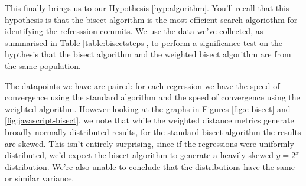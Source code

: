 \documentclass[10pt,journal,compsoc]{IEEEtran}
\begin{document}
\begin{figure*}[t]
\centering
{}
\hfil
{}
\hfil
{}
\hfil
{}
\caption{\label{fig:c-bisect}Histograms for the C language of the number of steps required to complete the bisect algorithm using (a) the standard metrix; (b) the weighted commit metric; (c) the weighted lines changed metric; (d) the weighted hunks changed metric. The dashed line indicates the mean, the dotted lines a one-standard-deviation interval on each side it.}
\end{figure*}

\begin{figure*}[t]
\centering
{}
\hfil
{}
\hfil
{}
\hfil
{}
\caption{\label{fig:javascript-bisect}Histograms for the JavaScript language of the number of steps required to complete the bisect algorithm using (a) the standard metrix; (b) the weighted commit metric; (c) the weighted lines changed metric; (d) the weighted hunks changed metric. The dashed line indicates the mean, the dotted lines a one-standard-deviation interval on each side it.}
\end{figure*}

This finally brings us to our Hypothesis \ref{hyp:algorithm}. You'll recall that this hypothesis is that the bisect algorithm is the most efficient search algoriothm for identifying the refresssion commits. We use the data we've collected, as summarised in Table \ref{table:bisectsteps}, to perform a significance test on the hypthesis that the bisect algorithm and the weighted bisect algorithm are from the same population.

The datapoints we have are paired: for each regression we have the speed of convergence using the standard algorithm and the speed of convergence using the weighted algorithm. However looking at the graphs in Figures \ref{fig:c-bisect} and \ref{fig:javascript-bisect}, we note that while the weighted distance metrics generate broadly normally distributed results, for the standard bisect algorithm the results are skewed. This isn't entirely surprising, since if the regressions were uniformly distributed, we'd expect the bisect algorithm to generate a heavily skewed $y = 2^x$ distribution. We're also unable to conclude that the distributions have the same or similar variance.
\end{document}
